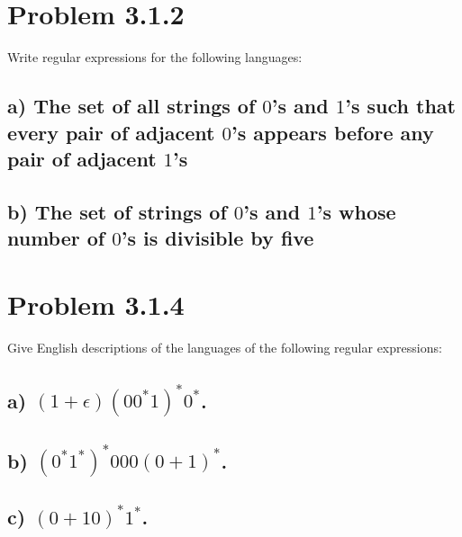 \documentclass[20pt]{article} %
\begin{document}
\section{Problem 3.1.2}
Write regular expressions for the following languages:

\subsection{a) The set of all strings of $0$'s and $1$'s such that every pair of adjacent $0$'s appears before any pair of adjacent $1$'s}

\subsection{b) The set of strings of $0$'s and $1$'s whose number of $0$'s is divisible by five}

\section{Problem 3.1.4}
Give English descriptions of the languages of the following regular expressions:

\subsection{a) $(1 + \epsilon)(00^{*}1)^{*}0^{*}$.}

\subsection{b) $(0^{*}1^{*})^{*}000(0+1)^{*}$.}

\subsection{c) $(0+10)^{*}1^{*}$.}
\end{document}
